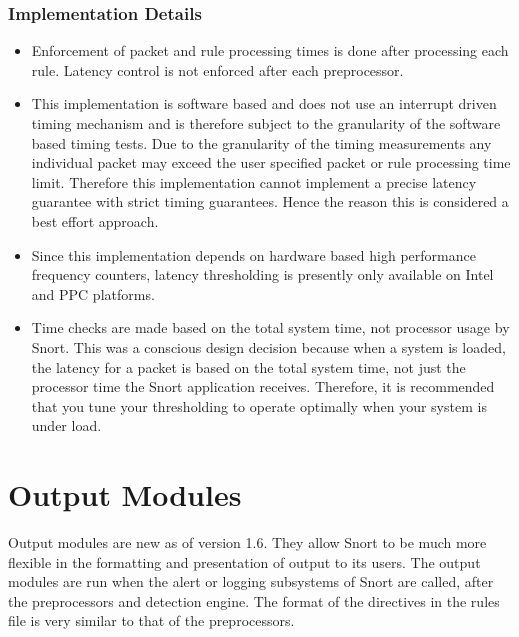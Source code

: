 \documentclass[english]{report}
\begin{document}
\subsubsection{Implementation Details}

\begin{itemize}

\item Enforcement of packet and rule processing times is done after processing
each rule.  Latency control is not enforced after each preprocessor.  

\item This implementation is software based and does not use an interrupt
driven timing mechanism and is therefore subject to the granularity of the
software based timing tests. Due to the granularity of the timing measurements
any individual packet may exceed the user specified packet or rule processing
time limit.  Therefore this implementation cannot implement a precise latency
guarantee with strict timing guarantees.  Hence the reason this is considered a
best effort approach.

\item Since this implementation depends on hardware based high performance
frequency counters, latency thresholding is presently only available on Intel
and PPC platforms. 

\item Time checks are made based on the total system time, not processor usage
by Snort.  This was a conscious design decision because when a system is
loaded, the latency for a packet is based on the total system time, not just
the processor time the Snort application receives.  Therefore, it is
recommended that you tune your thresholding to operate optimally when your
system is under load.

\end{itemize}

\section{Output Modules}
\label{output config}

Output modules are new as of version 1.6. They allow Snort to be much more
flexible in the formatting and presentation of output to its users. The output
modules are run when the alert or logging subsystems of Snort are called, after
the preprocessors and detection engine.  The format of the directives in the
rules file is very similar to that of the preprocessors.
\end{document}

